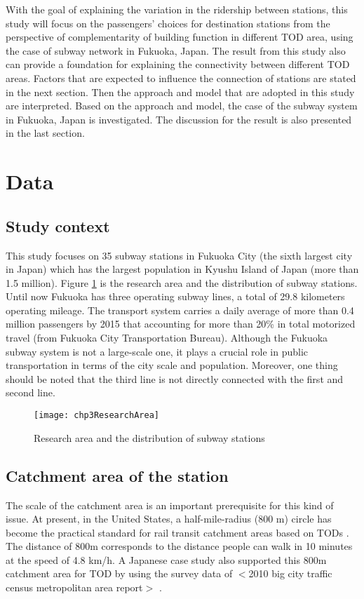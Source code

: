 %
With the goal of explaining the variation in the ridership between stations, this study will focus on the passengers’ choices for destination stations from the perspective of complementarity of building function in different TOD area, using the case of subway network in Fukuoka, Japan. The result from this study also can provide a foundation for explaining the connectivity between different TOD areas. Factors that are expected to influence the connection of stations are stated in the next section. Then the approach and model that are adopted in this study are interpreted. Based on the approach and model, the case of the subway system in Fukuoka, Japan is investigated. The discussion for the result is also presented in the last section.

%
\section{Data}

%
\subsection{Study context}
%
This study focuses on 35 subway stations in Fukuoka City (the sixth largest city in Japan) which has the largest population in Kyushu Island of Japan (more than 1.5 million). Figure \ref{fig:chp3:ResearchArea} is the research area and the distribution of subway stations. Until now Fukuoka has three operating subway lines, a total of 29.8 kilometers operating mileage. The transport system carries a daily average of more than 0.4 million passengers by 2015 that accounting for more than 20\% in total motorized travel (from Fukuoka City Transportation Bureau). Although the Fukuoka subway system is not a large-scale one, it plays a crucial role in public transportation in terms of the city scale and population. Moreover, one thing should be noted that the third line is not directly connected with the first and second line.

\begin{figure}[htbp]
	\centering
	\texttt{[image: chp3ResearchArea]}
	\caption{Research area and the distribution of subway stations}
	\label{fig:chp3:ResearchArea}
\end{figure}

%
\subsection{Catchment area of the station}
%
The scale of the catchment area is an important prerequisite for this kind of issue. At present, in the United States, a half-mile-radius (800 m) circle has become the practical standard for rail transit catchment areas based on TODs \cite{guerra2013half}. The distance of 800m corresponds to the distance people can walk in 10 minutes at the speed of 4.8 km/h. A Japanese case study also supported this 800m catchment area for TOD by using the survey data of $<$2010 big city traffic census metropolitan area report$>$ \cite{tadakatsu2015empirical}.

